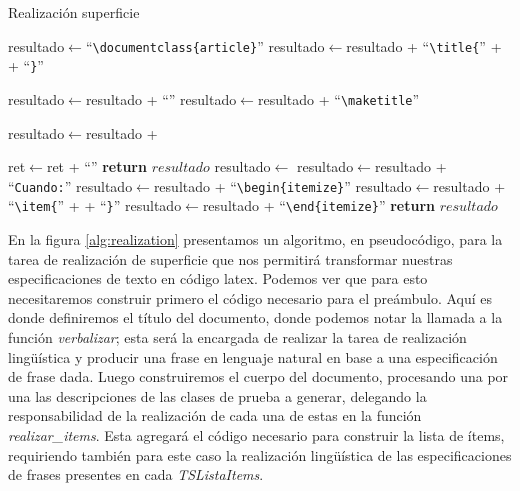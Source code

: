 \begin{algorithm}
  \caption{Realización superficie}\label{alg:realization}
  \begin{algorithmic}[1]
  
  \State resultado$\gets$``\verb|\documentclass{article}|''
  \State resultado$\gets$resultado + ``\verb|\title{|'' +  + ``\verb|}|''
  
  \State resultado$\gets$resultado + ``\verb||''
  \State resultado$\gets$resultado + ``\verb|\maketitle|''
  
    \State resultado$\gets$resultado +   
  \EndFor

  \State ret$\gets$ret + ``\verb||''
  \State \textbf{return} $resultado$
  \EndFunction
  \Statex
    \State resultado$\gets$ 
	\State resultado$\gets$resultado + ``\verb|Cuando:|''
    \State resultado$\gets$resultado + ``\verb|\begin{itemize}|''
      \State resultado$\gets$resultado + ``\verb|\item{|'' +  + ``\verb|}|'' 
    \EndFor  
    \State resultado$\gets$resultado + ``\verb|\end{itemize}|''
    \State \textbf{return} $resultado$
  \EndFunction
\end{algorithmic}
\end{algorithm}

En la figura \ref{alg:realization} presentamos un algoritmo, en pseudocódigo, para la tarea de realización de superficie que nos permitirá transformar nuestras especificaciones de texto en código latex. Podemos ver que para esto necesitaremos construir primero el código necesario para el preámbulo. Aquí es donde definiremos el título del documento, donde podemos notar la llamada a la función \emph{verbalizar}; esta será la encargada de realizar la tarea de realización lingüística y producir una frase en lenguaje natural en base a una especificación de frase dada. Luego construiremos el cuerpo del documento, procesando una por una las descripciones de las clases de prueba a generar, delegando la responsabilidad de la realización de cada una de estas en la función \emph{realizar\_items}. Esta agregará el código necesario para construir la lista de ítems, requiriendo también para este caso la realización lingüística de las especificaciones de frases presentes en cada \emph{TSListaItems}.

